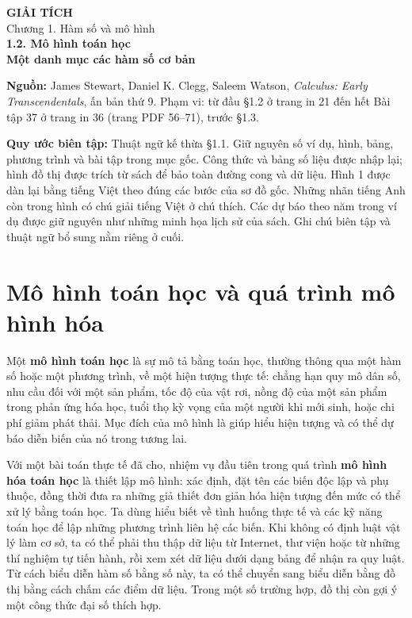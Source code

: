 \documentclass[12pt,a4paper]{article}
\begin{document}
\begin{center}
{\Large\bfseries GIẢI TÍCH}\\[5pt]
{\large Chương 1. Hàm số và mô hình}\\[9pt]
{\Large\bfseries 1.2. Mô hình toán học}\\[4pt]
{\large\bfseries Một danh mục các hàm số cơ bản}
\end{center}
\noindent\textbf{Nguồn:} James Stewart, Daniel K. Clegg, Saleem Watson, \textit{Calculus: Early Transcendentals}, ấn bản thứ 9. Phạm vi: từ đầu §1.2 ở trang in 21 đến hết Bài tập 37 ở trang in 36 (trang PDF 56–71), trước §1.3.

\noindent\textbf{Quy ước biên tập:} Thuật ngữ kế thừa §1.1. Giữ nguyên số ví dụ, hình, bảng, phương trình và bài tập trong mục gốc. Công thức và bảng số liệu được nhập lại; hình đồ thị được trích từ sách để bảo toàn đường cong và dữ liệu. Hình 1 được dàn lại bằng tiếng Việt theo đúng các bước của sơ đồ gốc. Những nhãn tiếng Anh còn trong hình có chú giải tiếng Việt ở chú thích. Các dự báo theo năm trong ví dụ được giữ nguyên như những minh họa lịch sử của sách. Ghi chú biên tập và thuật ngữ bổ sung nằm riêng ở cuối.

\section*{Mô hình toán học và quá trình mô hình hóa}
Một \textbf{mô hình toán học} là sự mô tả bằng toán học, thường thông qua một hàm số hoặc một phương trình, về một hiện tượng thực tế: chẳng hạn quy mô dân số, nhu cầu đối với một sản phẩm, tốc độ của vật rơi, nồng độ của một sản phẩm trong phản ứng hóa học, tuổi thọ kỳ vọng của một người khi mới sinh, hoặc chi phí giảm phát thải. Mục đích của mô hình là giúp hiểu hiện tượng và có thể dự báo diễn biến của nó trong tương lai.

Với một bài toán thực tế đã cho, nhiệm vụ đầu tiên trong quá trình \textbf{mô hình hóa toán học} là thiết lập mô hình: xác định, đặt tên các biến độc lập và phụ thuộc, đồng thời đưa ra những giả thiết đơn giản hóa hiện tượng đến mức có thể xử lý bằng toán học. Ta dùng hiểu biết về tình huống thực tế và các kỹ năng toán học để lập những phương trình liên hệ các biến. Khi không có định luật vật lý làm cơ sở, ta có thể phải thu thập dữ liệu từ Internet, thư viện hoặc từ những thí nghiệm tự tiến hành, rồi xem xét dữ liệu dưới dạng bảng để nhận ra quy luật. Từ cách biểu diễn hàm số bằng số này, ta có thể chuyển sang biểu diễn bằng đồ thị bằng cách chấm các điểm dữ liệu. Trong một số trường hợp, đồ thị còn gợi ý một công thức đại số thích hợp.
\end{document}
